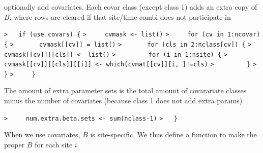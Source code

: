 \documentclass[a4paper]{article}
\begin{document}
optionally add covariates. Each covar class (except class 1) adds an extra copy of $B$,
where rows are cleared if that site/time combi does not participate in\par
\verb~>   if (use.covars) {~\newline
\verb~>     cvmask <- list()~\newline
\verb~>     for (cv in 1:ncovar) {~\newline
\verb~>       cvmask[[cv]] = list()~\newline
\verb~>       for (cls in 2:nclass[cv]) {~\newline
\verb~>         cvmask[[cv]][[cls]] <- list()~\newline
\verb~>         for (i in 1:nsite) {~\newline
\verb~>           cvmask[[cv]][[cls]][[i]] <- which(cvmat[[cv]][i, ]!=cls)~\newline
\verb~>         }~\newline
\verb~>       }~\newline
\verb~>     }~\par
The amount of extra parameter sets is the total amount of covarariate classes
minus the number of covariates (because class 1 does not add extra params)\par
\verb~>     num.extra.beta.sets <- sum(nclass-1)~\newline
\verb~>   }~\par

When we use covariates, $B$ is site-specific. We thus define a function to make
the proper $B$ for each site $i$\par
\end{document}
